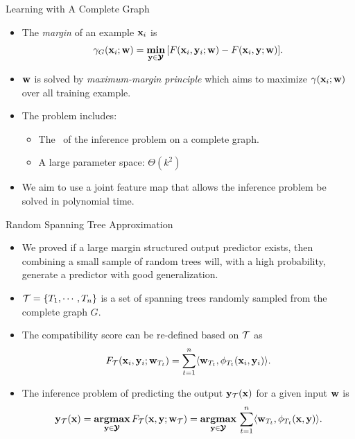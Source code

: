 \documentclass[first=dgreen,second=purple,logo=yellowexc]{aaltoslides}
\begin{document}
%
\begin{frame}{Learning with A Complete Graph}
	\begin{itemize}
		\item The \textit{margin} of an example $\mathbf {x}_i$ is
		\begin{align*}
			\gamma_G(\mathbf {x}_i;\mathbf {w}) = \underset{\mathbf {y}\in\pmb {\mathcal{Y}}}{\textbf{min}}\,[F(\mathbf {x}_i,\mathbf {y}_i;\mathbf {w})-F(\mathbf {x}_i,\mathbf {y};\mathbf {w})].
		\end{align*}
		\item $\mathbf {w}$ is solved by \textit{maximum-margin principle} which aims to maximize $\gamma(\mathbf {x}_i;\mathbf {w})$ over all training example.
		\item The problem includes:
		\begin{itemize}
			\item The \nphardness\ of the inference problem on a complete graph.
			\item A large parameter space: $\Theta(k^2)$
		\end{itemize}
		\item We aim to use a joint feature map that allows the inference problem be solved in polynomial time.
	\end{itemize}
\end{frame}



%
\begin{frame}{Random Spanning Tree Approximation}
	\begin{itemize}
		\item We proved if a large margin structured output predictor exists, then combining a small sample of random trees will, with a high probability, generate a predictor with good generalization.
		\item $\mathcal{T}=\{T_1,\cdots,T_n\}$ is a set of spanning trees randomly sampled from the complete graph $G$.
		\item The compatibility score can be re-defined based on $\mathcal{T}$ as
		\begin{align*}
			F_{\mathcal{T}}(\mathbf {x}_i,\mathbf {y}_i;\mathbf {w}_{T_t}) = \sum_{t=1}^{n}\langle \mathbf {w}_{T_t}, \phi_{T_t}(\mathbf {x}_i,\mathbf {y}_i) \rangle.
		\end{align*}
		\item The inference problem of predicting the output $\mathbf {y}_{\mathcal{T}}(\mathbf {x})$ for a given input $\mathbf {w}$ is 
		\begin{align*}
			\mathbf {y}_{\mathcal{T}}(\mathbf {x}) = \underset{\mathbf {y}\in\pmb {\mathcal{Y}}}{\textbf{argmax}}\,F_{\mathcal{T}}(\mathbf {x},\mathbf {y};\mathbf {w}_{\mathcal{T}})=\underset{\mathbf {y}\in\pmb {\mathcal{Y}}}{\textbf{argmax}}\,\sum_{t=1}^{n}\langle \mathbf {w}_{T_t}, \phi_{T_t}(\mathbf {x},\mathbf {y}) \rangle.
		\end{align*}
	\end{itemize}
\end{frame}
\end{document}
